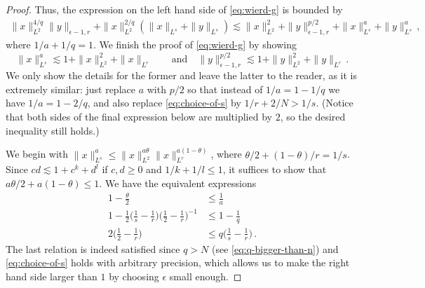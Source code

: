\documentclass[final]{amsart}
\numberwithin{thm}{section}
\numberwithin{equation}{section}
\begin{document}
\begin{proof}
Thus, the expression on the left hand side of \eqref{eq:wierd-g} is bounded by
\begin{multline*}
        \|x\|_{L^2}^{4/q}\|y\|_{\epsilon-1,r} + \|x\|_{L^2}^{2/q}(\|x\|_{L^s} + \|y\|_{L^s}) 
        \lesssim \|x\|_{L^2}^2 + \|y\|_{\epsilon-1,r}^{p/2} + \|x\|_{L^s}^a + \|y\|_{L^s}^a \,,
    \end{multline*}
where $1/a + 1/q = 1$. We finish the proof of \eqref{eq:wierd-g} by showing 
\begin{equation}
 \|x\|_{L^s}^a \lesssim 1 + \|x\|_{L^2}^2 + \|x\|_{L^r} \qquad \textrm{and} \quad 
\|y\|_{\epsilon-1,r}^{p/2} \lesssim 1+ \|y\|_{L^2}^2 + \|y\|_{L^r} \,.
\end{equation}
 We only show the details for the former and leave the latter to the reader, as it is extremely similar: just replace $a$ with $p/2$ so that instead of $1/a = 1-1/q$ we have $1/a = 1-2/q$, and also replace \eqref{eq:choice-of-s} by $1/r + 2/N > 1/s$. 
 (Notice that both sides of the final expression below are multiplied by $2$, so the desired inequality still holds.)

We begin with $\|x\|_{L^s}^a \leq \|x\|_{L^2}^{a\theta}\|x\|_{L^r}^{a(1-\theta)}$, where $\theta/2 + (1-\theta)/r = 1/s$. Since $cd \lesssim 1 + c^k + d^l$ if $c,d \geq 0$ and $1/k + 1/l \leq 1$, it  suffices to show that $a\theta/2 + a(1-\theta) \leq 1$. We have the equivalent expressions
\begin{align*}
    1-\frac{\theta}{2} &\leq \frac{1}{a} \\
    1- \frac{1}{2}\Big(\frac{1}{s}-\frac{1}{r}\Big)\Big(\frac{1}{2}-\frac{1}{r}\Big)^{-1} &\leq 1 - \frac{1}{q} \\
    2\Big(\frac{1}{2}- \frac{1}{r}\Big) &\leq q\Big(\frac{1}{s}- \frac{1}{r}\Big) \,.
\end{align*}
The last relation is indeed satisfied since $q > N$ (see \eqref{eq:q-bigger-than-n}) and \eqref{eq:choice-of-s} holds with arbitrary precision, which allows us to make the right hand side larger than $1$ by choosing $\epsilon$ small enough.





\end{proof}
\end{document}
